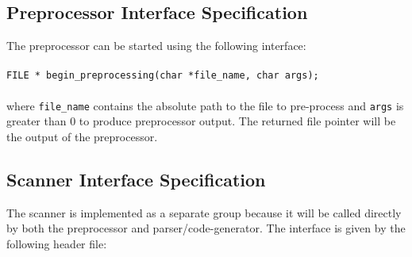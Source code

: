 \documentclass{article}
\begin{document}
\subsection{Preprocessor Interface Specification}
The preprocessor can be started using the following interface:\\ \\ 
\texttt{FILE * begin\_preprocessing(char *file\_name, char args);}\\ \\
where \texttt{file\_name} contains the absolute path to the file to pre-process and \texttt{args} is greater than 0 to produce preprocessor output.
The returned file pointer will be the output of the preprocessor.

\subsection{Scanner Interface Specification}
The scanner is implemented as a separate group because it will be called directly by both the preprocessor and parser/code-generator.
The interface is given by the following header file:
\end{document}
